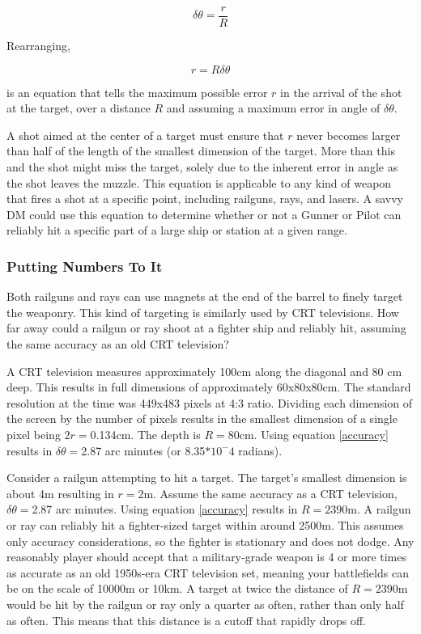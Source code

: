 \documentclass[a4paper]{article}
\begin{document}
\begin{equation} \delta\theta = \frac{r}{R} \end{equation}

Rearranging,

\begin{equation} \label{accuracy}
r = R \delta\theta
\end{equation}

is an equation that tells the maximum possible error $r$ in the arrival of the shot at the target, over a distance $R$ and assuming a maximum error in angle of $\delta\theta$.

A shot aimed at the center of a target must ensure that $r$ never becomes larger than half of the length of the smallest dimension of the target. More than this and the shot might miss the target, solely due to the inherent error in angle as the shot leaves the muzzle. This equation is applicable to any kind of weapon that fires a shot at a specific point, including railguns, rays, and lasers. A savvy DM could use this equation to determine whether or not a Gunner or Pilot can reliably hit a specific part of a large ship or station at a given range. 

\subsubsection{Putting Numbers To It}

Both railguns and rays can use magnets at the end of the barrel to finely target the weaponry. This kind of targeting is similarly used by CRT televisions. How far away could a railgun or ray shoot at a fighter ship and reliably hit, assuming the same accuracy as an old CRT television?

A CRT television measures approximately 100cm along the diagonal and 80 cm deep. This results in full dimensions of approximately 60x80x80cm. The standard resolution at the time was 449x483 pixels at 4:3 ratio. Dividing each dimension of the screen by the number of pixels results in the smallest dimension of a single pixel being $2r=$0.134cm. The depth is $R=$80cm. Using equation \ref{accuracy} results in $\delta\theta=$2.87 arc minutes (or 8.35$*10^-4$ radians).

Consider a railgun attempting to hit a target. The target's smallest dimension is about 4m resulting in $r=$2m. Assume the same accuracy as a CRT television, $\delta\theta=$2.87 arc minutes. Using equation \ref{accuracy} results in $R=2390$m. A railgun or ray can reliably hit a fighter-sized target within around 2500m. This assumes only accuracy considerations, so the fighter is stationary and does not dodge. Any reasonably player should accept that a military-grade weapon is 4 or more times as accurate as an old 1950s-era CRT television set, meaning your battlefields can be on the scale of 10000m or 10km. A target at twice the distance of $R=2390$m would be hit by the railgun or ray only a quarter as often, rather than only half as often. This means that this distance is a cutoff that rapidly drops off.
\end{document}
